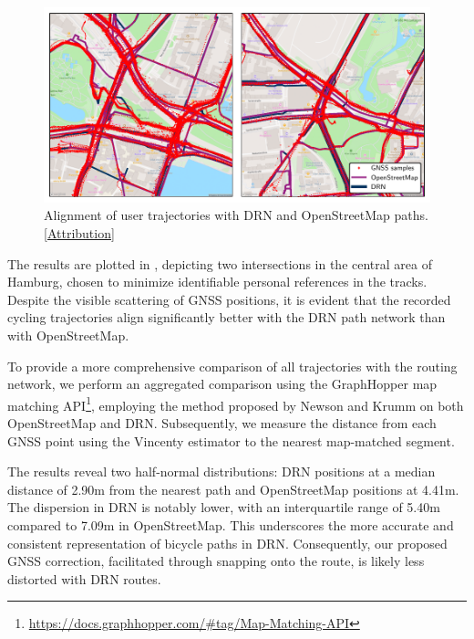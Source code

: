 \begin{figure}[!b]
\centering 
\includegraphics[width=\linewidth]{images/routing-mapmatching-distance.pdf}
\caption{Alignment of user trajectories with DRN and OpenStreetMap paths. [\hyperref[attribution]{Attribution}]}
\label{fig:routing-mapmatching-distance}
\end{figure}

The results are plotted in , depicting two intersections in the central area of Hamburg, chosen to minimize identifiable personal references in the tracks. Despite the visible scattering of GNSS positions, it is evident that the recorded cycling trajectories align significantly better with the DRN path network than with OpenStreetMap.

To provide a more comprehensive comparison of all trajectories with the routing network, we perform an aggregated comparison using the GraphHopper map matching API\footnote{\url{https://docs.graphhopper.com/\#tag/Map-Matching-API}}, employing the method proposed by Newson and Krumm \cite{newson_hidden_2009} on both OpenStreetMap and DRN. Subsequently, we measure the distance from each GNSS point using the Vincenty estimator to the nearest map-matched segment.

The results reveal two half-normal distributions: DRN positions at a median distance of 2.90m from the nearest path and OpenStreetMap positions at 4.41m. The dispersion in DRN is notably lower, with an interquartile range of 5.40m compared to 7.09m in OpenStreetMap. This underscores the more accurate and consistent representation of bicycle paths in DRN. Consequently, our proposed GNSS correction, facilitated through snapping onto the route, is likely less distorted with DRN routes.

